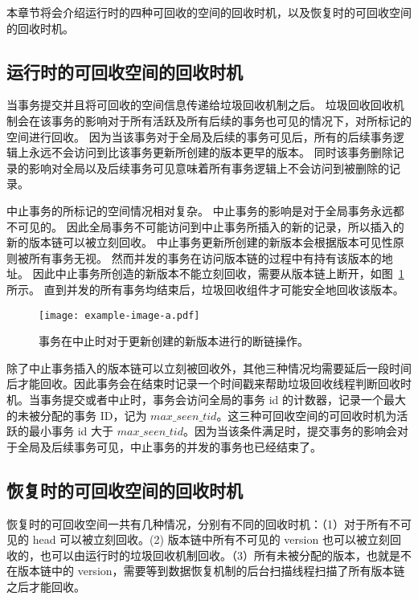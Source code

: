 本章节将会介绍运行时的四种可回收的空间的回收时机，以及恢复时的可回收空间的回收时机。

\subsection{运行时的可回收空间的回收时机}

当事务提交并且将可回收的空间信息传递给垃圾回收机制之后。
垃圾回收回收机制会在该事务的影响对于所有活跃及所有后续的事务也可见的情况下，对所标记的空间进行回收。
因为当该事务对于全局及后续的事务可见后，所有的后续事务逻辑上永远不会访问到比该事务更新所创建的版本更早的版本。
同时该事务删除记录的影响对全局以及后续事务可见意味着所有事务逻辑上不会访问到被删除的记录。

中止事务的所标记的空间情况相对复杂。
中止事务的影响是对于全局事务永远都不可见的。
因此全局事务不可能访问到中止事务所插入的新的记录，所以插入的新的版本链可以被立刻回收。
中止事务更新所创建的新版本会根据版本可见性原则被所有事务无视。
然而并发的事务在访问版本链的过程中有持有该版本的地址。
因此中止事务所创造的新版本不能立刻回收，需要从版本链上断开，如图~\ref{fig:insert-abort} 所示。
直到并发的所有事务均结束后，垃圾回收组件才可能安全地回收该版本。

\begin{figure}
    \centering
    \texttt{[image: example-image-a.pdf]}
    \caption{事务在中止时对于更新创建的新版本进行的断链操作。}
    \label{fig:insert-abort}
\end{figure}

除了中止事务插入的版本链可以立刻被回收外，其他三种情况均需要延后一段时间后才能回收。因此事务会在结束时记录一个时间戳来帮助垃圾回收线程判断回收时机。当事务提交或者中止时，事务会访问全局的事务 id 的计数器，记录一个最大的未被分配的事务 ID，记为 $max\_seen\_tid$。这三种可回收空间的可回收时机为活跃的最小事务 id 大于 $max\_seen\_tid$。因为当该条件满足时，提交事务的影响会对于全局及后续事务可见，中止事务的并发的事务也已经结束了。

\subsection{恢复时的可回收空间的回收时机}

恢复时的可回收空间一共有几种情况，分别有不同的回收时机：（1）对于所有不可见的 head 可以被立刻回收。(2) 版本链中所有不可见的 version 也可以被立刻回收的，也可以由运行时的垃圾回收机制回收。（3）所有未被分配的版本，也就是不在版本链中的 version，需要等到数据恢复机制的后台扫描线程扫描了所有版本链之后才能回收。



